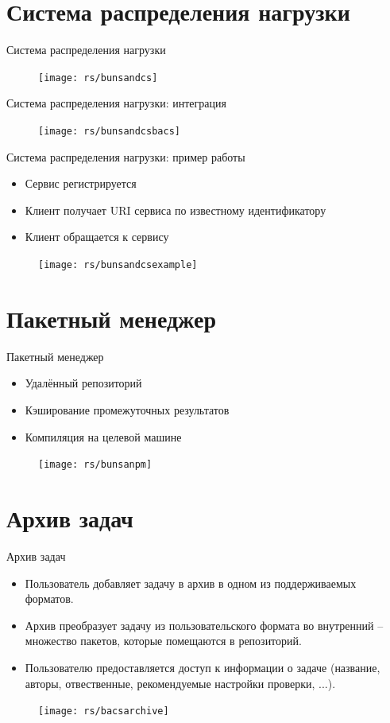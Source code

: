 \documentclass[xetex,mathserif,serif,10pt]{beamer}
\newenvironment{sframe}[2]{\section{#1}\begin{frame}[label=#2]{#1}}{\end{frame}}
\begin{document}
    \begin{sframe}{Система распределения нагрузки}{dcs}
        \begin{figure}
            \centering
            \texttt{[image: rs/bunsandcs]}
        \end{figure}
    \end{sframe}

    \begin{frame}{Система распределения нагрузки: интеграция}
        \begin{figure}
            \centering
            \texttt{[image: rs/bunsandcsbacs]}
        \end{figure}
    \end{frame}
    
    \begin{frame}{Система распределения нагрузки: пример работы}
        \begin{itemize}
            \item Сервис регистрируется
            \item Клиент получает URI сервиса по известному идентификатору
            \item Клиент обращается к сервису
        \end{itemize}
        \begin{figure}
            \centering
            \texttt{[image: rs/bunsandcsexample]}
        \end{figure}
    \end{frame}

    \begin{sframe}{Пакетный менеджер}{bunsanpm}
        \begin{itemize}
            \item Удалённый репозиторий
            \item Кэширование промежуточных результатов
            \item Компиляция на целевой машине
        \end{itemize}
        \begin{figure}
            \centering
            \texttt{[image: rs/bunsanpm]}
        \end{figure}
    \end{sframe}

    \begin{sframe}{Архив задач}{bacsarchive}
        \begin{itemize}
            \item Пользователь добавляет задачу в архив в одном из поддерживаемых форматов.
            \item Архив преобразует задачу из пользовательского формата во внутренний --
                множество пакетов, которые помещаются в репозиторий.
            \item Пользователю предоставляется доступ к информации о задаче
                (название, авторы, отвественные, рекомендуемые настройки проверки, ...).
        \end{itemize}
        \begin{figure}
            \centering
            \texttt{[image: rs/bacsarchive]}
        \end{figure}
    \end{sframe}
\end{document}
